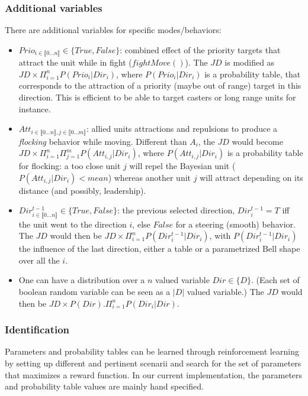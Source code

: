 \subsubsection{Additional variables}
There are additional variables for specific modes/behaviors:
\begin{itemize}
\item $Prio_{i \in \llbracket 0 \dots n\rrbracket } \in \{True, False\}$: combined effect of the priority targets that attract the unit while in fight ($fightMove()$). The $JD$ is modified as $JD \times \Pi_{i=1}^{n} P(Prio_i | Dir_i)$, where $P(Prio_i | Dir_i)$ is a probability table, that corresponds to the attraction of a priority (maybe out of range) target in this direction. This is efficient to be able to target casters or long range units for instance.

\item $Att_{i \in \llbracket 0 \dots n\rrbracket, j \in \llbracket 0 \dots m \rrbracket}$: allied units attractions and repulsions to produce a \textit{flocking} behavior while moving. Different than $A_i$, the $JD$ would become $JD \times \Pi_{i=1}^{n} \Pi_{j=1}^{m} P(Att_{i,j} | Dir_i)$, where $P(Att_{i,j} | Dir_i)$ is a probability table for flocking: a too close unit $j$ will repel the Bayesian unit ($P(Att_{i,j} | Dir_i) < mean$) whereas another unit $j$ will attract depending on its distance (and possibly, leadership).

\item $Dir_{i \in \llbracket 0 \dots n\rrbracket }^{t-1} \in \{True, False\}$: the previous selected direction, $Dir_i^{t-1} = T$ iff the unit went to the direction $i$, else $False$ for a steering (smooth) behavior. The $JD$ would then be $JD \times \Pi_{i=1}^{n} P(Dir_i^{t-1} | Dir_i)$, with $P(Dir_i^{t-1} | Dir_i)$ the influence of the last direction, either a table or a parametrized Bell shape over all the $i$.

\item One can have a distribution over a $n$ valued variable $Dir \in \{D\}$. (Each set of boolean random variable can be seen as a $|D|$ valued variable.) The $JD$ would then be $JD \times P(Dir).\Pi_{i=1}^{n} P(Dir_i | Dir)$.
\end{itemize}

\subsubsection{Identification}

Parameters and probability tables can be learned through reinforcement learning \citep{Sutton,Asmuth09} by setting up different and pertinent scenarii and search for the set of parameters that maximizes a reward function. In our current implementation, the parameters and probability table values are mainly hand specified.

